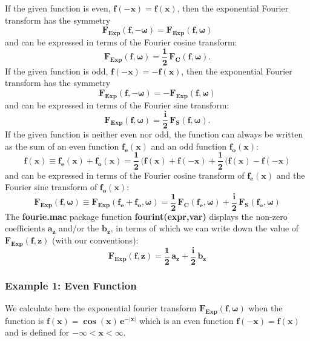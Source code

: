\documentclass[12pt]{article}
\begin{document}
\noindent If the given function is even, $\mathbf{f(-x) = f(x) }$, then the
exponential Fourier transform has the symmetry 
\begin{equation}
\mathbf{F_{Exp}(f,\boldsymbol{-\omega}) = F_{Exp}(f,\boldsymbol{\omega}) }
\end{equation}
and can be expressed in terms of the Fourier cosine transform:
\begin{equation}
\mathbf{F_{Exp}(f,\boldsymbol{\omega}) = \frac{1}{2} \, F_{C}(f,\boldsymbol{\omega})}.
\end{equation}
If the given function is odd, $\mathbf{f(-x) = -f(x) }$, then the
exponential Fourier transform has the symmetry 
\begin{equation}
\mathbf{F_{Exp}(f,\boldsymbol{-\omega}) = -F_{Exp}(f,\boldsymbol{\omega}) }
\end{equation}
and can be expressed in terms of the Fourier sine transform:
\begin{equation}
\mathbf{F_{Exp}(f,\boldsymbol{\omega}) = \frac{i}{2} \, F_{S}(f,\boldsymbol{\omega})}.
\end{equation}
If the given function is neither even nor odd, the function can always be written
  as the sum of an even function $\mathbf{f_{e}(x)}$ and an odd function $\mathbf{f_{o}(x)}$:
\begin{equation}
\mathbf{f(x) \equiv f_{e}(x) + f_{o}(x) = 
  \frac{1}{2} \,( f(x) + f(-x) + \frac{1}{2} \, ( f(x) - f(-x) }
\end{equation}
and can be expressed in terms of the Fourier cosine transform of $\mathbf{f_{e}(x)}$
  and the Fourier sine transform of $\mathbf{f_{o}(x)}$:
\begin{equation}
\mathbf{F_{Exp}(f,\boldsymbol{\omega}) \equiv F_{Exp}(f_{e}+f_{o},\boldsymbol{\omega}) =
  \frac{1}{2} \, F_{C}(f_{e},\boldsymbol{\omega}) +
  \frac{i}{2} \, F_{S}(f_{o},\boldsymbol{\omega}) }
\end{equation}
The \textbf{fourie.mac} package function \textbf{fourint(expr,var)} displays the non-zero
coefficients $\mathbf{a_{z}}$ and/or the $\mathbf{b_{z}}$, in terms of which we can
write down the value of $\mathbf{F_{Exp}(f,z)}$ (with our conventions):
\begin{equation}
\mathbf{F_{Exp}(f,z) = \frac{1}{2} \, a_{z} + \frac{i}{2} \, b_{z} }
\end{equation}
\subsubsection{Example 1: Even Function}
We calculate here the exponential fourier transform $\mathbf{F_{Exp}(f,\boldsymbol{\omega})}$
  when the function is $\mathbf{f(x) = \cos(x) \, e^{-\vert x \vert} }$ which is
  an even function $\mathbf{f(-x) = f(x)}$ and is defined for $\mathbf{-\infty < x < \infty}$.\\
  
\end{document}
